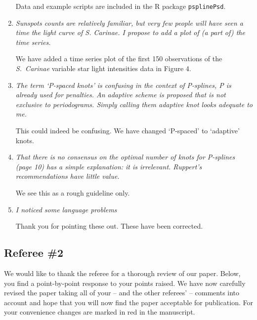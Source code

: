 \documentclass{scrartcl}
\newcommand{\refereeQuote}{\textit }
\newcommand{\response}{}
\begin{document}
\begin{enumerate}
\response{Data and example scripts are included in the R package \texttt{psplinePsd}.}\bigskip


\item
\refereeQuote{Sunspots counts are relatively familiar, but very few people will have seen a time the light curve of S. Carinae. I propose to add a plot of (a part of) the time series.}\smallskip

\response{We have added a time series plot of the first 150 observations of the \textit{S.\ Carinae} variable star light intensities data in Figure 4}.\bigskip


\item
\refereeQuote{
The term `P-spaced knots' is confusing in the context of P-splines, P is already used for penalties. An adaptive scheme is proposed that is not exclusive to periodograms. Simply calling them adaptive knot looks adequate to me.}\smallskip

\response{ This could indeed be confusing. We have changed `P-spaced' to `adaptive' knots.}\bigskip

\item
\refereeQuote{That there is no consensus on the optimal number of knots for P-splines (page 10) has a simple explanation: it is irrelevant. Ruppert's recommendations have little value.}\smallskip

\response{We see this as a rough guideline only.}\bigskip


\item
\refereeQuote{I noticed some language problems}\smallskip

\response{Thank you for pointing these out. These have been corrected.}


\end{enumerate}

\newpage

\subsection*{Referee \#2}


\response{We would like to thank the referee for a thorough review of our paper. Below, you find a point-by-point response to your points raised. We have now carefully revised the paper taking all of your -- and the other referees' -- comments into account and hope that you will now find the paper acceptable for publication. For your convenience changes are marked in red in the manuscript.
} \smallskip
\end{document}
